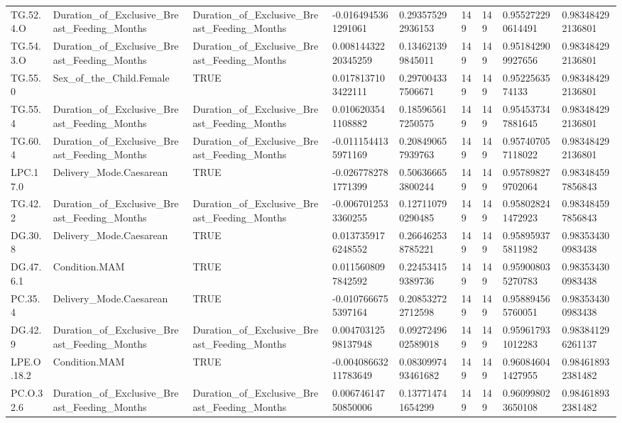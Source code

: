 \begin{longtable}{lllllllll}
TG.52.4.O & Duration\_of\_Exclusive\_Breast\_Feeding\_Months & Duration\_of\_Exclusive\_Breast\_Feeding\_Months & -0.0164945361291061 & 0.293575292936153 & 149 & 149 & 0.955272290614491 & 0.983484292136801 \\
TG.54.3.O & Duration\_of\_Exclusive\_Breast\_Feeding\_Months & Duration\_of\_Exclusive\_Breast\_Feeding\_Months & 0.00814432220345259 & 0.134621399845011 & 149 & 149 & 0.951842909927656 & 0.983484292136801 \\
TG.55.0 & Sex\_of\_the\_Child.Female & TRUE & 0.0178137103422111 & 0.297004337506671 & 149 & 149 & 0.9522563574133 & 0.983484292136801 \\
TG.55.4 & Duration\_of\_Exclusive\_Breast\_Feeding\_Months & Duration\_of\_Exclusive\_Breast\_Feeding\_Months & 0.0106203541108882 & 0.185965617250575 & 149 & 149 & 0.954537347881645 & 0.983484292136801 \\
TG.60.4 & Duration\_of\_Exclusive\_Breast\_Feeding\_Months & Duration\_of\_Exclusive\_Breast\_Feeding\_Months & -0.0111544135971169 & 0.208490657939763 & 149 & 149 & 0.957407057118022 & 0.983484292136801 \\
LPC.17.0 & Delivery\_Mode.Caesarean & TRUE & -0.0267782781771399 & 0.506366653800244 & 149 & 149 & 0.957898279702064 & 0.983484597856843 \\
TG.42.2 & Duration\_of\_Exclusive\_Breast\_Feeding\_Months & Duration\_of\_Exclusive\_Breast\_Feeding\_Months & -0.0067012533360255 & 0.127110790290485 & 149 & 149 & 0.958028241472923 & 0.983484597856843 \\
DG.30.8 & Delivery\_Mode.Caesarean & TRUE & 0.0137359176248552 & 0.266462538785221 & 149 & 149 & 0.958959375811982 & 0.983534300983438 \\
DG.47.6.1 & Condition.MAM & TRUE & 0.0115608097842592 & 0.224534159389736 & 149 & 149 & 0.959008035270783 & 0.983534300983438 \\
PC.35.4 & Delivery\_Mode.Caesarean & TRUE & -0.0107666755397164 & 0.208532722712598 & 149 & 149 & 0.958894565760051 & 0.983534300983438 \\
DG.42.9 & Duration\_of\_Exclusive\_Breast\_Feeding\_Months & Duration\_of\_Exclusive\_Breast\_Feeding\_Months & 0.00470312598137948 & 0.0927249602589018 & 149 & 149 & 0.959617931012283 & 0.983841296261137 \\
LPE.O.18.2 & Condition.MAM & TRUE & -0.00408663211783649 & 0.0830997493461682 & 149 & 149 & 0.960846041427955 & 0.984618932381482 \\
PC.O.32.6 & Duration\_of\_Exclusive\_Breast\_Feeding\_Months & Duration\_of\_Exclusive\_Breast\_Feeding\_Months & 0.00674614750850006 & 0.137714741654299 & 149 & 149 & 0.960998023650108 & 0.984618932381482 \\

\end{longtable}
